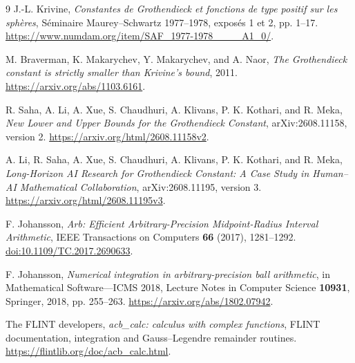 \begin{thebibliography}{9}
J.-L. Krivine,
\emph{Constantes de Grothendieck et fonctions de type positif sur les sph\`eres},
S\'eminaire Maurey--Schwartz 1977--1978, expos\'es 1 et 2, pp. 1--17.
\url{https://www.numdam.org/item/SAF_1977-1978____A1_0/}.

M. Braverman, K. Makarychev, Y. Makarychev, and A. Naor,
\emph{The Grothendieck constant is strictly smaller than Krivine's bound},
2011. \url{https://arxiv.org/abs/1103.6161}.

R. Saha, A. Li, A. Xue, S. Chaudhuri, A. Klivans, P. K. Kothari,
and R. Meka,
\emph{New Lower and Upper Bounds for the Grothendieck Constant},
arXiv:2608.11158, version 2.
\url{https://arxiv.org/html/2608.11158v2}.

A. Li, R. Saha, A. Xue, S. Chaudhuri, A. Klivans, P. K. Kothari,
and R. Meka,
\emph{Long-Horizon AI Research for Grothendieck Constant:
A Case Study in Human--AI Mathematical Collaboration},
arXiv:2608.11195, version 3.
\url{https://arxiv.org/html/2608.11195v3}.

F. Johansson, \emph{Arb: Efficient Arbitrary-Precision Midpoint-Radius
Interval Arithmetic}, IEEE Transactions on Computers \textbf{66} (2017),
1281--1292. \href{https://doi.org/10.1109/TC.2017.2690633}
{doi:10.1109/TC.2017.2690633}.

F. Johansson, \emph{Numerical integration in arbitrary-precision ball
arithmetic}, in Mathematical Software---ICMS 2018, Lecture Notes in
Computer Science \textbf{10931}, Springer, 2018, pp. 255--263.
\url{https://arxiv.org/abs/1802.07942}.

The FLINT developers, \emph{acb\_calc: calculus with complex functions},
FLINT documentation, integration and Gauss--Legendre remainder routines.
\url{https://flintlib.org/doc/acb_calc.html}.
\end{thebibliography}
